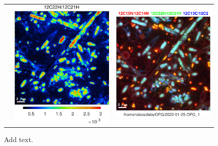 \begin{figure}[!ht]
\begin{tabular}{ccc}
&
\includegraphics[scale=\scf, valign=t]{figs8/12C22H-12C21H}
&
\includegraphics[scale=\scf, valign=t]{figs8/12C15N-12C14N-vs-12C22H-12C21H-vs-12C13C-12C2-rgb}
\end{tabular}
\caption{\label{fig:LANS-8plus-ratios}%
Add text.}
\end{figure}
